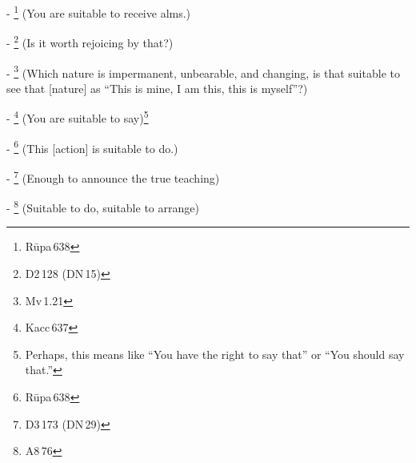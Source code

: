 - \footnote{R\=upa\,638} (You are suitable to receive alms.)\par
- \footnote{D2\,128 (DN\,15)} (Is it worth rejoicing by that?)\par
- \footnote{Mv\,1.21} (Which nature is impermanent, unbearable, and changing, is that suitable to see that [nature] as ``This is mine, I am this, this is myself''?)\par
- \footnote{Kacc\,637} (You are suitable to say)\footnote{Perhaps, this means like ``You have the right to say that'' or ``You should say that.''}\par
- \footnote{R\=upa\,638} (This [action] is suitable to do.)\par
- \footnote{D3\,173 (DN\,29)} (Enough to announce the true teaching)\par
- \footnote{A8\,76} (Suitable to do, suitable to arrange)\par

